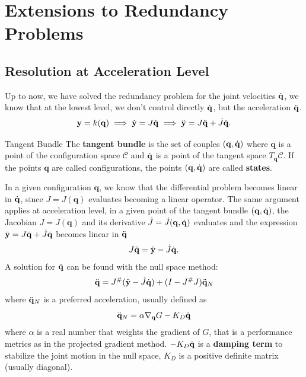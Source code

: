 \documentclass[10pt, a4paper]{report}
\newcommand{\q}{{\mathbf q}}
\begin{document}
\section{Extensions to Redundancy Problems}
\subsection{Resolution at Acceleration Level}
Up to now, we have solved the redundancy problem for the joint velocities ${\dot{\mathbf q}}$, we know that at the lowest level, we don't control directly ${\dot{\mathbf q}}$, but the acceleration ${\ddot{\mathbf q}}$.\begin{equation}
    \mathbf y = k(\mathbf q)\implies {\dot{\mathbf y}}=J{\dot{\mathbf q}}\implies {\ddot{\mathbf y}}=J{\ddot{\mathbf q}}+\dot J{\dot{\mathbf q}}.
\end{equation}
\begin{boxdefinition}{Tangent Bundle}{}
    The \textbf{tangent bundle} is the set of couples $(\mathbf q,{\dot{\mathbf q}})$ where $\mathbf q$ is a point of the configuration space $\mathcal C$ and ${\dot{\mathbf q}}$ is a point of the tangent space $T_{\mathbf q}\mathcal C$. If the points $\q$ are called configurations, the points $(\q,\dq)$ are called \textbf{states}. 
\end{boxdefinition}
In a given configuration $\mathbf q$, we know that the differential problem becomes linear in ${\dot{\mathbf q}}$, since $J=J(\mathbf q)$ evaluates becoming a linear operator. The same argument applies at acceleration level, in a given point of the tangent bundle $(\mathbf q, {\dot{\mathbf q}})$, the Jacobian $J=J(\mathbf q)$ and its derivative $\dot J=\dot J(\mathbf q,{\dot{\mathbf q}})$ evaluates and the expression ${\ddot{\mathbf y}}=J{\ddot{\mathbf q}}+\dot J{\dot{\mathbf q}}$ becomes linear in ${\ddot{\mathbf q}}$\begin{equation}
   J{\ddot{\mathbf q}} = {\ddot{\mathbf y}} -\dot J{\dot{\mathbf q}}.
\end{equation}
A solution for ${\ddot{\mathbf q}}$ can be found with the null space method:\begin{equation}
    {\ddot{\mathbf q}}=J^\#({\ddot{\mathbf y}}-\dot J{\dot{\mathbf q}})+(I-J^\#J){\ddot{\mathbf q}}_N
\end{equation}
where ${\ddot{\mathbf q}}_N$ is a preferred acceleration, usually defined as\begin{equation}
    {\ddot{\mathbf q}}_N=\alpha\nabla_{\mathbf q}G-K_D{\dot{\mathbf q}} 
\end{equation}
where $\alpha$ is a real number that weights the gradient of $G$, that is a performance metrics as in the projected gradient method. $-K_D{\dot{\mathbf q}}$ is a \textbf{damping term} to stabilize the joint motion in the null space, $K_D$ is a positive definite matrix (usually diagonal).\bigskip 
\end{document}
